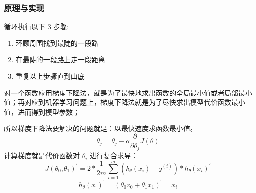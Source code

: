 \documentclass[UTF8,a4paper,AutoFakeBold,AutoFakeSlant]{article}
\begin{document}
\subsubsection{原理与实现}
循环执行以下 3 步骤:
\begin{enumerate}
  \item 环顾周围找到最陡的一段路
  \item 在最陡的一段路上走一段距离
  \item 重复以上步骤直到山底
\end{enumerate}

对一个函数应用梯度下降法，就是为了最快地求出函数的全局最小值或者局部最小值；再对应到机器学习问题上，梯度下降法就是为了尽快求出模型代价函数最小值，进而得到模型参数；

所以梯度下降法要解决的问题就是：以最快速度求函数最小值。
\begin{equation*}
  \theta_{j}=\theta_{j}-\alpha \frac{\partial}{\partial \theta_{j}} J(\theta)
\end{equation*}
计算梯度就是代价函数对 $\theta_i$ 进行复合求导：
\begin{equation*}
  J\left(\theta_{0}, \theta_{1}\right)^{\prime} = 2 * \frac{1}{2 m} \sum_{i = 1}^{m}\left(h_{\theta}\left(x_{i}\right)-y^{(i)}\right) * h_{\theta}\left(x_{i}\right)^{\prime}
\end{equation*}
\begin{equation*}
  h_{\theta}\left(x_{i}\right)^{\prime} = \left(\theta_{0} x_{0}+\theta_{1} x_{1}\right)^{\prime} = x_{i}
\end{equation*}
\end{document}
